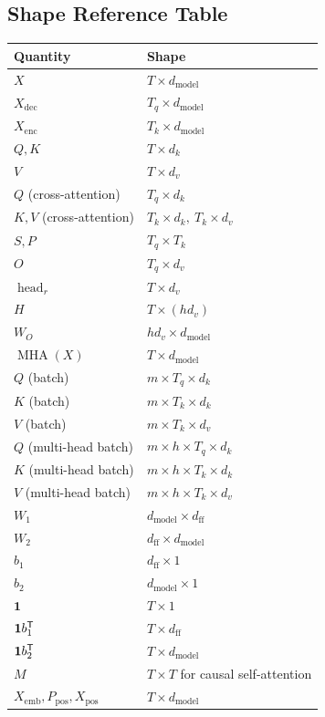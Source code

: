 
\subsection{Shape Reference Table}

\begin{center}
\begin{tabular}{ll}
\toprule
Quantity & Shape \\
\midrule
$X$ & $T \times d_{\mathrm{model}}$ \\
$X_{\mathrm{dec}}$ & $T_q \times d_{\mathrm{model}}$ \\
$X_{\mathrm{enc}}$ & $T_k \times d_{\mathrm{model}}$ \\
$Q,K$ & $T \times d_k$ \\
$V$ & $T \times d_v$ \\
$Q$ (cross-attention) & $T_q \times d_k$ \\
$K,V$ (cross-attention) & $T_k \times d_k,\ T_k \times d_v$ \\
$S,P$ & $T_q \times T_k$ \\
$O$ & $T_q \times d_v$ \\
$\operatorname{head}_r$ & $T \times d_v$ \\
$H$ & $T \times (h d_v)$ \\
$W_O$ & $h d_v \times d_{\mathrm{model}}$ \\
$\operatorname{MHA}(X)$ & $T \times d_{\mathrm{model}}$ \\
$Q$ (batch) & $m \times T_q \times d_k$ \\
$K$ (batch) & $m \times T_k \times d_k$ \\
$V$ (batch) & $m \times T_k \times d_v$ \\
$Q$ (multi-head batch) & $m \times h \times T_q \times d_k$ \\
$K$ (multi-head batch) & $m \times h \times T_k \times d_k$ \\
$V$ (multi-head batch) & $m \times h \times T_k \times d_v$ \\
$W_1$ & $d_{\mathrm{model}} \times d_{\mathrm{ff}}$ \\
$W_2$ & $d_{\mathrm{ff}} \times d_{\mathrm{model}}$ \\
$b_1$ & $d_{\mathrm{ff}} \times 1$ \\
$b_2$ & $d_{\mathrm{model}} \times 1$ \\
$\mathbf{1}$ & $T \times 1$ \\
$\mathbf{1}b_1^{\mathsf{T}}$ & $T \times d_{\mathrm{ff}}$ \\
$\mathbf{1}b_2^{\mathsf{T}}$ & $T \times d_{\mathrm{model}}$ \\
$M$ & $T \times T$ for causal self-attention \\
$X_{\mathrm{emb}},P_{\mathrm{pos}},X_{\mathrm{pos}}$ & $T \times d_{\mathrm{model}}$ \\
\bottomrule
\end{tabular}
\end{center}
